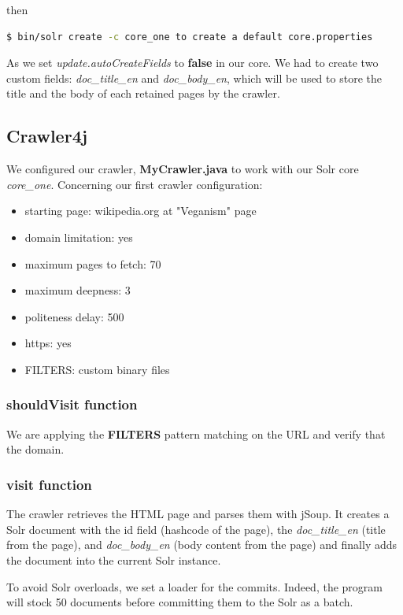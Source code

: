 \documentclass[a4paper]{article}
\begin{document}
then

\begin{lstlisting}[language=sh]
$ bin/solr create -c core_one to create a default core.properties
\end{lstlisting}

As we set \textit{update.autoCreateFields} to \textbf{false} in our core. We had to create two custom fields: \textit{doc\_title\_en} and \textit{doc\_body\_en}, which will be used to store the title and the body of each retained pages by the crawler.
\\
\subsection{Crawler4j}
We configured our crawler, \textbf{MyCrawler.java} to work with our Solr core \textit{core\_one}. Concerning our first crawler configuration:\\

\begin{itemize}  
\item starting page: wikipedia.org at "Veganism" page
\item domain limitation: yes
\item maximum pages to fetch: 70
\item maximum deepness: 3
\item politeness delay: 500
\item https: yes
\item FILTERS: custom binary files
\end{itemize}

\subsubsection{shouldVisit function}
We are applying the \textbf{FILTERS} pattern matching on the URL and verify that the domain.

\subsubsection{visit function}

The crawler retrieves the HTML page and parses them with jSoup. It creates a Solr document with the id field (hashcode of the page), the \textit{doc\_title\_en} (title from the page), and \textit{doc\_body\_en} (body content from the page) and finally adds the document into the current Solr instance.

To avoid Solr overloads, we set a loader for the commits. Indeed, the program will stock 50 documents before committing them to the Solr as a batch.
\end{document}
